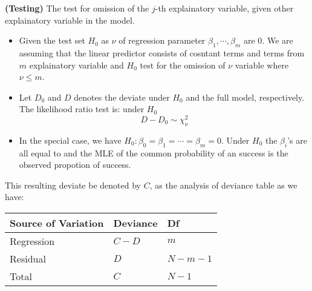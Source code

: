 \begin{remark}{\textbf{(Testing)}}
    The test for omission of the $j$-th explainatory variable, given other explainatory variable in the model. 
    \begin{itemize}
        \item Given the test set $H_0$ as $\nu$ of regression parameter $\beta_1,\cdots,\beta_m$ are $0$. We are assuming that the linear predictor consists of cosntant terms and terms from $m$ explainatory variable and $H_0$ test for the omission of $\nu$ variable where $\nu\le m$.
        \item Let $D_0$ and $D$ denotes the deviate under $H_0$ and the full model, respectively. The likelihood ratio test is: under $H_0$
        \begin{equation*}
            D-D_0 \sim \chi^2_\nu 
        \end{equation*}
        \item In the special case, we have $H_0 : \beta_0=\beta_1=\cdots=\beta_m=0$. Under $H_0$ the $\beta_i$'s are all equal to and the MLE of the common probability of an success is the observed propotion of success. 
    \end{itemize}
    This resulting deviate be denoted by $C$, as the analysis of deviance table as we have:
    \begin{table}[H]
    \centering
    \begin{tabular}{lll}
        \toprule
        \textbf{Source of Variation}   & \textbf{Deviance} & \textbf{Df}  \\
        \midrule
        Regression & $C-D$ & $m$ \\
        Residual & $D$ & $N-m-1$ \\
        \midrule
        Total & $C$ & $N-1$ \\
        \bottomrule
    \end{tabular}
    \end{table}
\end{remark}

